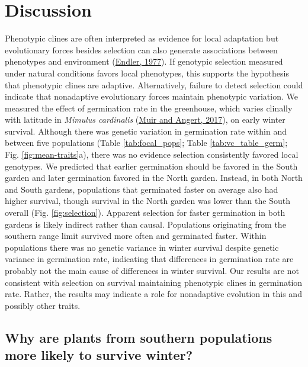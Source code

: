 \documentclass[
  12pt,
]{article}
\begin{document}
\hypertarget{discussion}{%
\section{Discussion}\label{discussion}}

Phenotypic clines are often interpreted as evidence for local adaptation but evolutionary forces besides selection can also generate associations between phenotypes and environment (\protect\hyperlink{ref-endler_geographic_1977}{Endler, 1977}). If genotypic selection measured under natural conditions favors local phenotypes, this supports the hypothesis that phenotypic clines are adaptive. Alternatively, failure to detect selection could indicate that nonadaptive evolutionary forces maintain phenotypic variation. We measured the effect of germination rate in the greenhouse, which varies clinally with latitude in \emph{Mimulus cardinalis} (\protect\hyperlink{ref-muir_grow_2017}{Muir and Angert, 2017}), on early winter survival. Although there was genetic variation in germination rate within and between five populations (Table \ref{tab:focal_pops}; Table \ref{tab:vc_table_germ}; Fig. \ref{fig:mean-traits}a), there was no evidence selection consistently favored local genotypes. We predicted that earlier germination should be favored in the South garden and later germination favored in the North garden. Instead, in both North and South gardens, populations that germinated faster on average also had higher survival, though survival in the North garden was lower than the South overall (Fig. \ref{fig:selection}). Apparent selection for faster germination in both gardens is likely indirect rather than causal. Populations originating from the southern range limit survived more often and germinated faster. Within populations there was no genetic variance in winter survival despite genetic variance in germination rate, indicating that differences in germination rate are probably not the main cause of differences in winter survival. Our results are not consistent with selection on survival maintaining phenotypic clines in germination rate. Rather, the results may indicate a role for nonadaptive evolution in this and possibly other traits.

\hypertarget{why-are-plants-from-southern-populations-more-likely-to-survive-winter}{%
\subsection{Why are plants from southern populations more likely to survive winter?}\label{why-are-plants-from-southern-populations-more-likely-to-survive-winter}}
\end{document}
